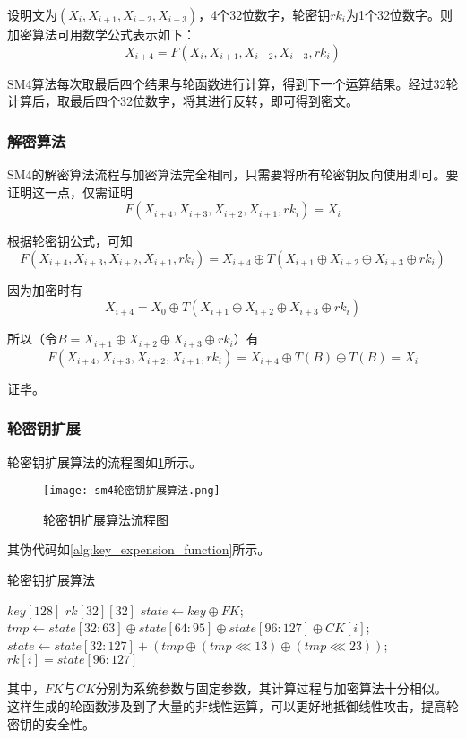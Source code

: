 \documentclass[a4paper, zihao=-4, UTF-8]{ctexart}
\begin{document}
				设明文为$(X_i, X_{i+1}, X_{i+2}, X_{i+3})$，4个32位数字，轮密钥$rk_i$为1个32位数字。则加密算法可用数学公式表示如下：
				$$X_{i+4}=F(X_i, X_{i+1}, X_{i+2}, X_{i+3},rk_i)$$
				
				SM4算法每次取最后四个结果与轮函数进行计算，得到下一个运算结果。经过32轮计算后，取最后四个32位数字，将其进行反转，即可得到密文。
			\subsubsection{解密算法}
				SM4的解密算法流程与加密算法完全相同，只需要将所有轮密钥反向使用即可。要证明这一点，仅需证明$$F(X_{i+4},X_{i+3},X_{i+2},X_{i+1}, rk_i) = X_i$$
				
				根据轮密钥公式，可知
				$$F(X_{i+4},X_{i+3},X_{i+2},X_{i+1}, rk_i)=X_{i+4}\oplus T(X_{i+1}\oplus X_{i+2}\oplus X_{i+3}\oplus rk_i)$$
				
				因为加密时有
				$$X_{i+4}=X_{0}\oplus T(X_{i+1}\oplus X_{i+2}\oplus X_{i+3}\oplus rk_i)$$
				
				所以（令$B=X_{i+1}\oplus X_{i+2}\oplus X_{i+3}\oplus rk_i$）有
				$$F(X_{i+4},X_{i+3},X_{i+2},X_{i+1}, rk_i)=X_{i+4}\oplus T(B)\oplus T(B)=X_i$$
				
				证毕。
			\subsubsection{轮密钥扩展}
				轮密钥扩展算法的流程图如\cref{fig:key_expension_flow_chart}所示。
				\begin{figure}[htbp]
					\centering
					\texttt{[image: sm4轮密钥扩展算法.png]}
					\caption{轮密钥扩展算法流程图}
					\label{fig:key_expension_flow_chart}
				\end{figure}
				
				其伪代码如\cref{alg:key_expension_function}所示。
				\begin{algorithm}
					\caption{轮密钥扩展算法}
					\label{alg:key_expension_function}
					\begin{algorithmic}[1]
						\Require $key[128]$
						\Ensure $rk[32][32]$
						\State $state\gets key\oplus FK$;
							\State $tmp\gets state[32:63]\oplus state[64:95]\oplus state[96:127]\oplus CK[i]$;
							\State $state \gets state[32:127] + (tmp\oplus (tmp\lll 13)\oplus (tmp\lll 23))$;
							\State $rk[i] = state[96:127]$
						\EndFor
						\State {}
						\EndFunction
					\end{algorithmic}
				\end{algorithm}
				其中，$FK$与$CK$分别为系统参数与固定参数，其计算过程与加密算法十分相似。这样生成的轮函数涉及到了大量的非线性运算，可以更好地抵御线性攻击，提高轮密钥的安全性。
\end{document}
